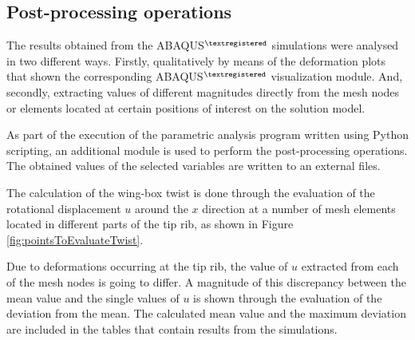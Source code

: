   \clearpage
  \subsection{Post-processing operations} \label{subsec:postProc_computationalModel} %

    The results obtained from the ABAQUS$^{\textregistered}$ simulations were analysed in two different ways. Firstly, qualitatively by means of the deformation plots that shown the corresponding ABAQUS$^{\textregistered}$ visualization module. And, secondly, extracting values of different magnitudes directly from the mesh nodes or elements located at certain positions of interest on the solution model.


    As part of the execution of the parametric analysis program written using Python scripting, an additional module is used to perform the post-processing operations. The obtained values of the selected variables are written to an external files. 

    The calculation of the wing-box twist is done through the evaluation of the rotational displacement $u$ around the $x$ direction at a number of mesh elements located in different parts of the tip rib, as shown in Figure \ref{fig:pointsToEvaluateTwist}.

    Due to deformations occurring at the tip rib, the value of $u$ extracted from each of the mesh nodes is going to differ. A magnitude of this discrepancy between the mean value and the single values of $u$ is shown through the evaluation of the deviation from the mean. The calculated mean value and the maximum deviation are included in the tables that contain results from the simulations.

